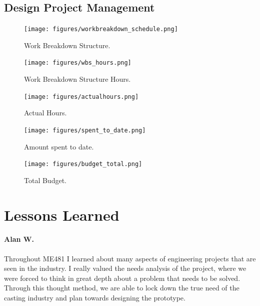 \documentclass[11pt]{article}
\begin{document}
\begin{appendices}
\begin{center}
\section{Design Project Management}
\end{center}
\vspace*{\fill}

\newpage



\begin{figure}
\centering
\texttt{[image: figures/workbreakdown\_schedule.png]}
\caption{Work Breakdown Structure.}
\label{WBS}
\end{figure}

\begin{figure}[h]
\centering
\texttt{[image: figures/wbs\_hours.png]}
\caption{Work Breakdown Structure Hours.}
\label{WBS_hours}
\end{figure}

\begin{figure}
\centering
\texttt{[image: figures/actualhours.png]}
\caption{Actual Hours.}
\label{ActualHours}
\end{figure}

\begin{figure}
\centering
\texttt{[image: figures/spent\_to\_date.png]}
\caption{Amount spent to date.}
\label{SpentDate}
\end{figure}

\begin{figure}
\centering
\texttt{[image: figures/budget\_total.png]}
\caption{Total Budget.}
\label{BudgetTotal}
\end{figure}



\clearpage
\section{Lessons Learned}
\paragraph*{Alan W.}
Throughout ME481 I learned about many aspects of engineering projects that are seen in the industry. I really valued the needs analysis of the project, where we were forced to think in great depth about a problem that needs to be solved. Through this thought method, we are able to lock down the true need of the casting industry and plan towards designing the prototype.


\end{appendices}
\end{document}
